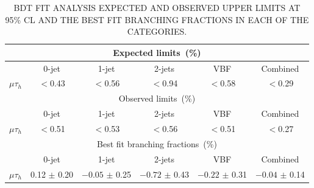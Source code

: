 \begin{table}[!htpb]
 \centering
 \caption{BDT FIT ANALYSIS EXPECTED AND OBSERVED UPPER LIMITS AT 95\% CL AND THE BEST FIT BRANCHING FRACTIONS IN EACH OF THE CATEGORIES.}
 \label{tab:expected_limits_BDTMethod2_MuTau}
\begin{tabular}{*{6}{c}}
\multicolumn{6}{c}{Expected limits~(\%) } \\ \hline
                       &  \multicolumn{1}{c}{0-jet}   & \multicolumn{1}{c}{1-jet}    &  \multicolumn{1}{c}{2-jets} & \multicolumn{1}{c}{VBF}  & \multicolumn{1}{c}{Combined}                 \\  \cline{2-6}
$\mu\tau_{h}$      &  $<$0.43      &  $<$0.56      &  $<$0.94      &  $<$0.58      &  $<$0.29    \\
\multicolumn{6}{c}{Observed limits~(\%)} \\ \hline
                       &  \multicolumn{1}{c}{0-jet}   & \multicolumn{1}{c}{1-jet}    &  \multicolumn{1}{c}{2-jets} & \multicolumn{1}{c}{VBF} &\multicolumn{1}{c}{Combined}                 \\ \cline{2-6}
$\mu\tau_{h}$              & $<$0.51       & $<$0.53       & $<$0.56       & $<$0.51       & $<$0.27    \\
\multicolumn{6}{c}{Best fit branching fractions~(\%)} \\ \hline
                       &  \multicolumn{1}{c}{0-jet}   & \multicolumn{1}{c}{1-jet}    &  \multicolumn{1}{c}{2-jets} & \multicolumn{1}{c}{VBF} &\multicolumn{1}{c}{Combined}                 \\  \cline{2-6}
$\mu\tau_{h}$              & 0.12 $\pm$ 0.20       & $-0.05$ $\pm$ 0.25    & $-0.72$ $\pm$ 0.43    & $-0.22$ $\pm$ 0.31    & $-0.04$ $\pm$ 0.14  \\  \hline
  \end{tabular}
\end{table}



